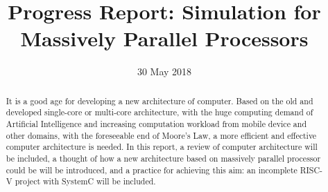 \documentclass{ecsprogress}
\begin{document}
\frontmatter 

\title{Progress Report: Simulation for Massively Parallel Processors}
\addresses  {\groupname\\\deptname\\\univname}
\date{30 May 2018}
\subject    {subject}
\maketitle

\begin{abstract}
It is a good age for developing a new architecture of computer\citep{dally1990performance}. Based on the old and developed single-core or multi-core architecture, with the huge computing demand of Artificial Intelligence and increasing computation workload from mobile device and other domains, with the foreseeable end of Moore’s Law, a more efficient and effective computer architecture is needed. In this report, a review of computer architecture will be included, a thought of how a new architecture based on massively parallel processor could be will be introduced, and a practice for achieving this aim: an incomplete RISC-V project with SystemC will be included. 
\end{abstract}

\tableofcontents
\setcounter{tocdepth}{4}
\listoffigures
\listoftables
\mainmatter

 



\backmatter  



\end{document}
